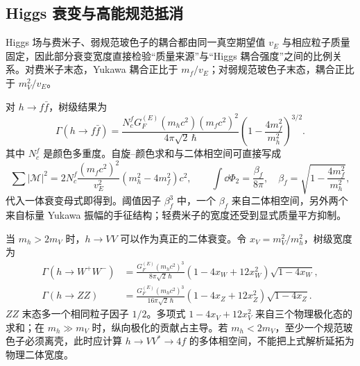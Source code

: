 \subsection{Higgs 衰变与高能规范抵消}

Higgs 场与费米子、弱规范玻色子的耦合都由同一真空期望值 $v_E$ 与相应粒子质量固定，因此部分衰变宽度直接检验“质量来源”与“Higgs 耦合强度”之间的比例关系。对费米子末态，Yukawa 耦合正比于 $m_f/v_E$；对弱规范玻色子末态，耦合正比于 $m_V^2/v_E$。

对 $h\to f\bar f$，树级结果为
\begin{equation}
{
\Gamma(h\to f\bar f)
=\frac{N_c^fG_F^{(E)}(m_hc^2)(m_fc^2)^2}
{4\pi\sqrt2\,\hbar}
\left(1-\frac{4m_f^2}{m_h^2}\right)^{3/2}.}
\label{eq:higgs-to-ff-rate-dp11}
\end{equation}
其中 $N_c^f$ 是颜色多重度。自旋--颜色求和与二体相空间可直接写成
\begin{equation*}
 \sum|\mathcal M|^2=2N_c^f\frac{(m_fc^2)^2}{v_E^2}(m_h^2-4m_f^2)c^2,
 \qquad
 \int\dd\Phi_2=\frac{\beta_f}{8\pi},\quad
 \beta_f=\sqrt{1-\frac{4m_f^2}{m_h^2}},
\end{equation*}
代入一体衰变母式即得到。阈值因子 $\beta_f^3$ 中，一个 $\beta_f$ 来自二体相空间，另外两个来自标量 Yukawa 振幅的手征结构；轻费米子的宽度还受到显式质量平方抑制。

当 $m_h>2m_V$ 时，$h\to VV$ 可以作为真正的二体衰变。令 $x_V=m_V^2/m_h^2$，树级宽度为
\begin{align}
\Gamma(h\to W^+W^-)
&=\frac{G_F^{(E)}(m_hc^2)^3}{8\pi\sqrt2\,\hbar}
(1-4x_W+12x_W^2)\sqrt{1-4x_W},\\
\Gamma(h\to ZZ)
&=\frac{G_F^{(E)}(m_hc^2)^3}{16\pi\sqrt2\,\hbar}
(1-4x_Z+12x_Z^2)\sqrt{1-4x_Z}.
\label{eq:higgs-to-vv-rates-dp11}
\end{align}
$ZZ$ 末态多一个相同粒子因子 $1/2$。多项式 $1-4x_V+12x_V^2$ 来自三个物理极化态的求和；在 $m_h\gg m_V$ 时，纵向极化的贡献占主导。若 $m_h<2m_V$，至少一个规范玻色子必须离壳，此时应计算 $h\to VV^*\to4f$ 的多体相空间，不能把上式解析延拓为物理二体宽度。


